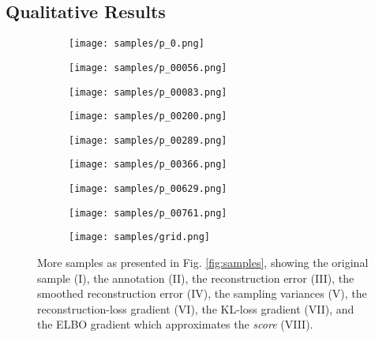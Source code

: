 \documentclass{article}
\begin{document}
\newpage

\subsection{Qualitative Results}

\begin{figure}[ht!]
  \centering
  \begin{subfigure}[b]{0.95\textwidth}
      \centering
      \texttt{[image: samples/p\_0.png]}
  \end{subfigure}
  \begin{subfigure}[b]{0.95\textwidth}
      \centering
      \texttt{[image: samples/p\_00056.png]}
  \end{subfigure}
  \begin{subfigure}[b]{0.95\textwidth}
      \centering
      \texttt{[image: samples/p\_00083.png]}
  \end{subfigure}
  \begin{subfigure}[b]{0.95\textwidth}
      \centering
      \texttt{[image: samples/p\_00200.png]}
  \end{subfigure}
  \begin{subfigure}[b]{0.95\textwidth}
      \centering
      \texttt{[image: samples/p\_00289.png]}
  \end{subfigure}
  \begin{subfigure}[b]{0.95\textwidth}
      \centering
      \texttt{[image: samples/p\_00366.png]}
  \end{subfigure}
  \begin{subfigure}[b]{0.95\textwidth}
      \centering
      \texttt{[image: samples/p\_00629.png]}
  \end{subfigure}
  \begin{subfigure}[b]{0.95\textwidth}
      \centering
      \texttt{[image: samples/p\_00761.png]}
  \end{subfigure}
  \begin{subfigure}[b]{0.95\textwidth}
      \centering
      \texttt{[image: samples/grid.png]}
  \end{subfigure}
  
\caption{More samples as presented in Fig. \ref{fig:samples}, showing the original sample (I), the annotation (II), the reconstruction error (III), the smoothed reconstruction error (IV), the sampling variances (V), the reconstruction-loss gradient  (VI), the KL-loss gradient (VII), and the ELBO gradient which approximates the \textit{score} (VIII).}
\label{fig:more1}
\end{figure}
\end{document}
